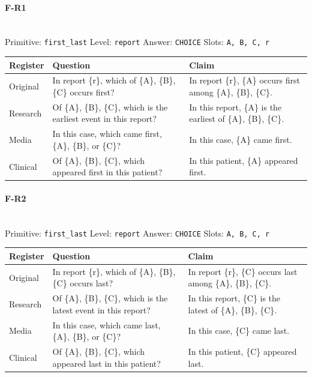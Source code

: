 \documentclass[11pt]{article}
\begin{document}
\paragraph{\textbf{F-R1}}\mbox{}\\
Primitive: \texttt{first\_last} \quad Level: \texttt{report} \quad Answer: \texttt{CHOICE} \quad Slots: \texttt{A, B, C, r}\\[2pt]
\begin{tabularx}{\linewidth}{@{}l L L@{}}
\toprule
\textbf{Register} & \textbf{Question} & \textbf{Claim} \\
\midrule
Original & In report \{r\}, which of \{A\}, \{B\}, \{C\} occurs first? & In report \{r\}, \{A\} occurs first among \{A\}, \{B\}, \{C\}. \\
Research & Of \{A\}, \{B\}, \{C\}, which is the earliest event in this report? & In this report, \{A\} is the earliest of \{A\}, \{B\}, \{C\}. \\
Media & In this case, which came first, \{A\}, \{B\}, or \{C\}? & In this case, \{A\} came first. \\
Clinical & Of \{A\}, \{B\}, \{C\}, which appeared first in this patient? & In this patient, \{A\} appeared first. \\
\bottomrule
\end{tabularx}
\vspace{4pt}

\paragraph{\textbf{F-R2}}\mbox{}\\
Primitive: \texttt{first\_last} \quad Level: \texttt{report} \quad Answer: \texttt{CHOICE} \quad Slots: \texttt{A, B, C, r}\\[2pt]
\begin{tabularx}{\linewidth}{@{}l L L@{}}
\toprule
\textbf{Register} & \textbf{Question} & \textbf{Claim} \\
\midrule
Original & In report \{r\}, which of \{A\}, \{B\}, \{C\} occurs last? & In report \{r\}, \{C\} occurs last among \{A\}, \{B\}, \{C\}. \\
Research & Of \{A\}, \{B\}, \{C\}, which is the latest event in this report? & In this report, \{C\} is the latest of \{A\}, \{B\}, \{C\}. \\
Media & In this case, which came last, \{A\}, \{B\}, or \{C\}? & In this case, \{C\} came last. \\
Clinical & Of \{A\}, \{B\}, \{C\}, which appeared last in this patient? & In this patient, \{C\} appeared last. \\
\bottomrule
\end{tabularx}
\vspace{4pt}
\end{document}
